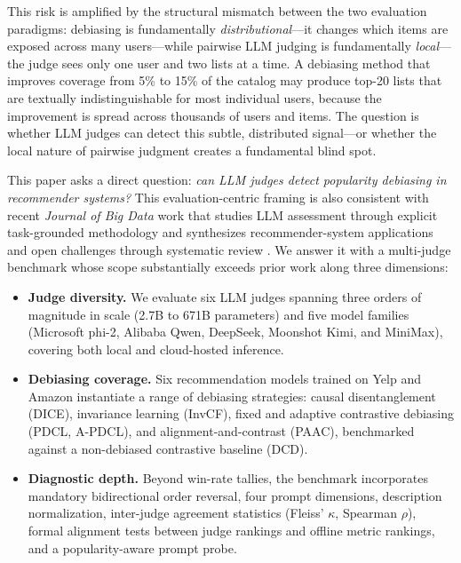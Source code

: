 \documentclass[pdflatex,sn-basic,referee,lineno]{sn-jnl}
\begin{document}
This risk is amplified by the structural mismatch between the two evaluation paradigms: debiasing is fundamentally \emph{distributional}---it changes which items are exposed across many users---while pairwise LLM judging is fundamentally \emph{local}---the judge sees only one user and two lists at a time. A debiasing method that improves coverage from 5\% to 15\% of the catalog may produce top-20 lists that are textually indistinguishable for most individual users, because the improvement is spread across thousands of users and items. The question is whether LLM judges can detect this subtle, distributed signal---or whether the local nature of pairwise judgment creates a fundamental blind spot.

This paper asks a direct question: \emph{can LLM judges detect popularity debiasing in recommender systems?} This evaluation-centric framing is also consistent with recent \emph{Journal of Big Data} work that studies LLM assessment through explicit task-grounded methodology \citep{misic2024openmp} and synthesizes recommender-system applications and open challenges through systematic review \citep{celikertugrul2025jobrec}. We answer it with a multi-judge benchmark whose scope substantially exceeds prior work along three dimensions:

\begin{itemize}
\item \textbf{Judge diversity.} We evaluate six LLM judges spanning three orders of magnitude in scale (2.7B to 671B parameters) and five model families (Microsoft phi-2, Alibaba Qwen, DeepSeek, Moonshot Kimi, and MiniMax), covering both local and cloud-hosted inference.
\item \textbf{Debiasing coverage.} Six recommendation models trained on Yelp and Amazon instantiate a range of debiasing strategies: causal disentanglement (DICE), invariance learning (InvCF), fixed and adaptive contrastive debiasing (PDCL, A-PDCL), and alignment-and-contrast (PAAC), benchmarked against a non-debiased contrastive baseline (DCD).
\item \textbf{Diagnostic depth.} Beyond win-rate tallies, the benchmark incorporates mandatory bidirectional order reversal, four prompt dimensions, description normalization, inter-judge agreement statistics (Fleiss' $\kappa$, Spearman $\rho$), formal alignment tests between judge rankings and offline metric rankings, and a popularity-aware prompt probe.
\end{itemize}
\end{document}
